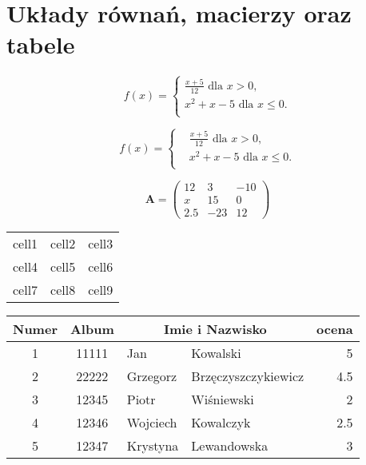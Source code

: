 \documentclass[a4paper, 12pt]{amsart}
\theoremstyle{definition}
\begin{document}
\section{Układy równań, macierzy oraz tabele}

\begin{equation}
f(x)=
\begin{cases}
\frac{x+5}{12}\mbox{ dla }x>0, \\
x^2+x-5 \mbox{ dla }x\le 0.\\ 
\end{cases}
 \end{equation}

\begin{equation}
f(x)=
\left\{\begin{split}
&\frac{x+5}{12}\mbox{ dla }x>0, \\
&x^2+x-5 \mbox{ dla }x\le 0.\\ 
\end{split}\right.
 \end{equation}


\begin{equation}
\mathbf{A} =
\left( \begin{array}{ccc}
12 & 3 & -10\\
x & 15 & 0 \\
2.5 & -23& 12
\end{array} \right)
\end{equation}


\begin{center}
\begin{tabular}{ c c c }
 cell1 & cell2 & cell3 \\ 
 cell4 & cell5 & cell6 \\  
 cell7 & cell8 & cell9    
\end{tabular}
\end{center}

\begin{center}
\begin{tabular}{|c| c|| l| l||r|} 
 \hline
Numer & Album &\multicolumn{2}{c||}{Imie i Nazwisko}&ocena\\ 
 \hline\hline
 1 & 11111 & Jan & Kowalski &5\\ 
 \hline
 2 &22222  & Grzegorz & Brzęczyszczykiewicz &4.5\\
 \hline
 3 & 12345& Piotr & Wiśniewski&2 \\
 \hline
 4 & 12346& Wojciech & Kowalczyk&2.5 \\
 \hline
 5 & 12347 &  Krystyna & Lewandowska&3 \\
 \hline
\end{tabular}
\end{center}
\end{document}
